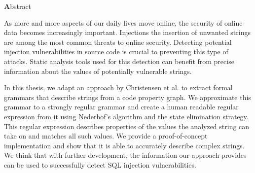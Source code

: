 \vspace*{2cm}

\begin{center}
{ \textbf Abstract}
\end{center}
\noindent


As more and more aspects of our daily lives move online, the security of online data becomes increasingly important. Injections \textendash{} the insertion of unwanted strings \textendash{} are among the most common threats to online security. Detecting potential injection vulnerabilities in source code is crucial to preventing this type of attacks. Static analysis tools used for this detection can benefit from precise information about the values of potentially vulnerable strings.

In this thesis, we adapt an approach by Christensen et al. to extract formal grammars that describe strings from a code property graph. 
We approximate this grammar to a strongly regular grammar and create a human readable regular expression from it using Nederhof's algorithm and the state elimination strategy.
This regular expression describes properties of the values the analyzed string can take on and matches all such values.
We provide a proof-of-concept implementation and show that it is able to accurately describe complex strings. We think that with further development, the information our approach provides can be used to successfully detect SQL injection vulnerabilities.
